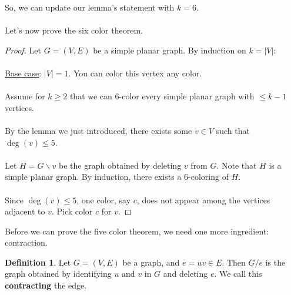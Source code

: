 \documentclass[]{article}
\theoremstyle{definition}
\newtheorem*{defn}{Definition}
\begin{document}
			So, we can update our lemma's statement with $k = 6$.
			\\ \\
			Let's now prove the six color theorem.
			\begin{proof}
				Let $G = (V, E)$ be a simple planar graph. By induction on $k = |V|$:
				\\ \\
				\underline{Base case}: $|V| = 1$. You can color this vertex any color.
				\\ \\
				Assume for $k \ge 2$ that we can 6-color every simple planar graph with $\le k - 1$ vertices.
				\\ \\
				By the lemma we just introduced, there exists some $v \in V$ such that $\deg(v) \le 5$.
				\\ \\
				Let $H = G \backslash v$ be the graph obtained by deleting $v$ from $G$. Note that $H$ is a simple planar graph. By induction, there exists a 6-coloring of $H$.
				\\ \\
				Since $\deg(v) \le 5$, one color, say $c$, does not appear among the vertices adjacent to $v$. Pick color $c$ for $v$.
			\end{proof}

			Before we can prove the five color theorem, we need one more ingredient: contraction.

			\begin{defn}
				Let $G = (V, E)$ be a graph, and $e = uv \in E$. Then $G/e$ is the graph obtained by identifying $u$ and $v$ in $G$ and deleting $e$. We call this \textbf{contracting} the edge.
			\end{defn}
\end{document}
